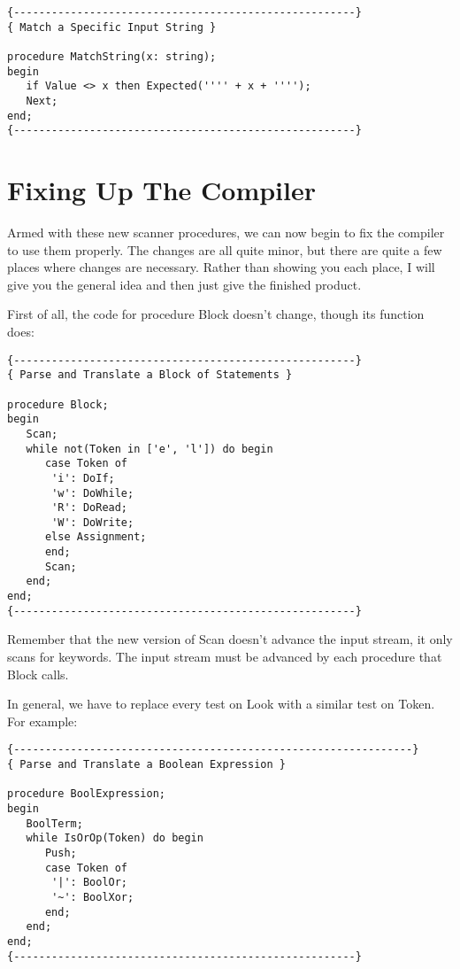 \begin{verbatim}
{------------------------------------------------------}
{ Match a Specific Input String }

procedure MatchString(x: string);
begin
   if Value <> x then Expected('''' + x + '''');
   Next;
end;
{------------------------------------------------------}
\end{verbatim}

\section{Fixing Up The Compiler}

Armed with these new scanner procedures, we can now begin  to fix the compiler to  use  them  properly. The changes are all quite minor, but  there  are quite a  few  places  where  changes  are necessary. Rather than  showing  you each place, I will give you the general idea and then just give the finished product.

First of all, the code for procedure Block doesn't change, though its function does:

\begin{verbatim}
{------------------------------------------------------}
{ Parse and Translate a Block of Statements }

procedure Block;
begin
   Scan;
   while not(Token in ['e', 'l']) do begin
      case Token of
       'i': DoIf;
       'w': DoWhile;
       'R': DoRead;
       'W': DoWrite;
      else Assignment;
      end;
      Scan;
   end;
end;
{------------------------------------------------------}
\end{verbatim}

Remember that the new version of Scan doesn't  advance  the input stream, it only  scans  for  keywords. The input stream must be advanced by each procedure that Block calls.

In general, we have to replace every test on Look with  a similar test on Token. For example:

\begin{verbatim}
{---------------------------------------------------------------}
{ Parse and Translate a Boolean Expression }

procedure BoolExpression;
begin
   BoolTerm;
   while IsOrOp(Token) do begin
      Push;
      case Token of
       '|': BoolOr;
       '~': BoolXor;
      end;
   end;
end;
{------------------------------------------------------}
\end{verbatim}


